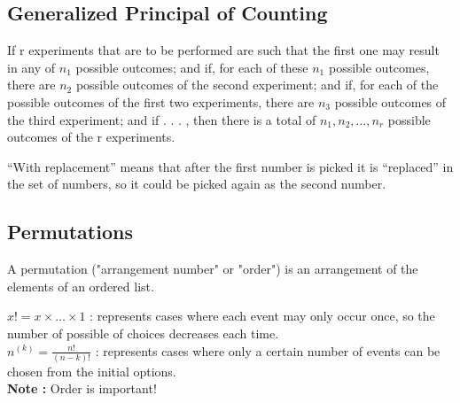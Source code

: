 \documentclass{article}
\newenvironment{ablock}[1]{%
    \tcolorbox[beamer,%
    noparskip,breakable,
    colback=lightcoral,colframe=darkred,%
    colbacklower=tomato!75!lightcoral,%
    title=#1]}%
    {\endtcolorbox}
\newenvironment{cblock}[1]{%
    \tcolorbox[beamer,%
    noparskip,breakable,
    colback=lightblue,colframe=darkblue,%
    colbacklower=darkblue!75!lightblue,%
    title=#1]}%
    {\endtcolorbox}
\begin{document}
\subsection{Generalized Principal of Counting}
If r experiments that are to be performed are such that the first one may result in any of \(n_1\) possible outcomes; and if, for each of these \(n_1\) possible outcomes, there are \(n_2\) possible outcomes of the second experiment; and if, for each of the possible outcomes of the first two experiments, there are \(n_3\) possible outcomes of the third experiment; and if . . . , then there is a total of \(n_1, n_2, \ldots, n_r\) possible outcomes of the r experiments.

\begin{ablock}{Note}
“With replacement” means that after the first number is picked it is “replaced” in the set of numbers, so it could be picked again as the second number.
\end{ablock}

\subsection{Permutations}
A permutation ("arrangement number" or "order") is an arrangement of the elements of an ordered list.

\begin{cblock}{Factorial Notation}
\(x! = x \times \ldots \times 1\) :  represents  cases where each event may only occur once, so the number of possible of choices decreases each time. \\


\(n^{(k)} = \frac{n!}{(n-k)!}\) : represents cases where only a certain number of events can be chosen from the initial options. \\

\textbf{Note : } Order is important!
\end{cblock}
\end{document}
